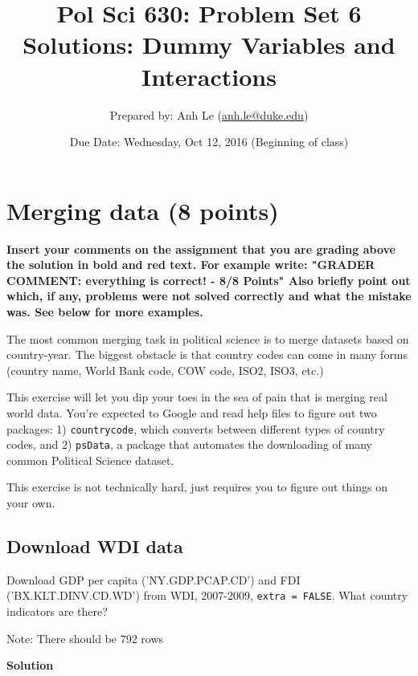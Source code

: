 \documentclass{article}\usepackage[]{graphicx}\usepackage[]{color}
\begin{document}
\title{Pol Sci 630:  Problem Set 6 Solutions: Dummy Variables and Interactions}

\author{Prepared by: Anh Le (\href{mailto:anh.le@duke.edu}{anh.le@duke.edu})}

\date{Due Date: Wednesday, Oct 12, 2016 (Beginning of class)}

\maketitle

\section{Merging data (8 points)}

\textbf{\color{red} Insert your comments on the assignment that you are grading above the solution in bold and red text. For example write: "GRADER COMMENT: everything is correct! - 8/8 Points" Also briefly point out which, if any, problems were not solved correctly and what the mistake was. See below for more examples.}

The most common merging task in political science is to merge datasets based on country-year. The biggest obstacle is that country codes can come in many forms (country name, World Bank code, COW code, ISO2, ISO3, etc.)

This exercise will let you dip your toes in the sea of pain that is merging real world data. You're expected to Google and read help files to figure out two packages: 1) \verb`countrycode`, which converts between different types of country codes, and 2) \verb`psData`, a package that automates the downloading of many common Political Science dataset.

This exercise is not technically hard, just requires you to figure out things on your own.


\subsection{Download WDI data}

Download GDP per capita ('NY.GDP.PCAP.CD') and FDI ('BX.KLT.DINV.CD.WD') from WDI, 2007-2009, \verb`extra = FALSE`. What country indicators are there?

Note: There should be 792 rows

\textbf{Solution}
\end{document}
